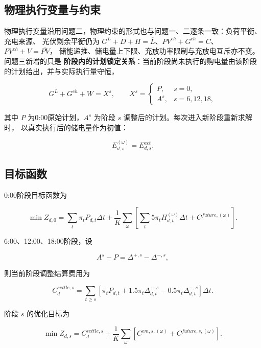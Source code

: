 \subsection{物理执行变量与约束}

物理执行变量沿用问题二，物理约束的形式也与问题一、二逐条一致：负荷平衡、充电来源、
光伏剩余平衡仍为 \(G^L+D+H=\overline L\)、\(PV^{ch}+G^{ch}=C\)、\(PV^{ch}+V=\overline{PV}\)，
储能递推、储电量上下限、充放功率限制与充放电互斥亦不变。问题三新增的只是
\textbf{阶段内的计划锁定关系}：当前阶段尚未执行的购电量由该阶段的计划给出，并与实际执行量守恒，

\begin{equation}
G^L+G^{ch}+W=X^s,
\qquad
X^s=
\begin{cases}
P,&s=0,\\
A^s,&s=6,12,18,
\end{cases}
\end{equation}

其中 \(P\) 为0:00原始计划，\(A^s\) 为阶段 \(s\) 调整后的计划。每次进入新阶段重新求解时，
以真实执行后的储电量作为初值：

\begin{equation}
E^{(\omega)}_{d,s}=E^{act}_{d,s}.
\end{equation}

\subsection{目标函数}

0:00阶段目标函数为

\begin{equation}
\min Z_{d,0}
=
\sum_t
\pi_tP_{d,t}\Delta t
+
\frac1K
\sum_{\omega}
\left[
\sum_t5\pi_tH^{(\omega)}_{d,t}\Delta t
+
C^{future,(\omega)}
\right].
\end{equation}

6:00、12:00、18:00阶段，设

\[
A^s-P
=
\Delta^{+,s}
-
\Delta^{-,s},
\]

则当前阶段调整结算费用为

\begin{equation}
C^{settle,s}_d
=
\sum_{t\ge s}
\left[
\pi_tP_{d,t}
+
1.5\pi_t\Delta^{+,s}_{d,t}
-
0.5\pi_t\Delta^{-,s}_{d,t}
\right]\Delta t.
\end{equation}

阶段 \(s\) 的优化目标为

\begin{equation}
\min Z_{d,s}
=
C^{settle,s}_d
+
\frac1K
\sum_{\omega}
\left[
C^{em,s,(\omega)}
+
C^{future,s,(\omega)}
\right].
\end{equation}

